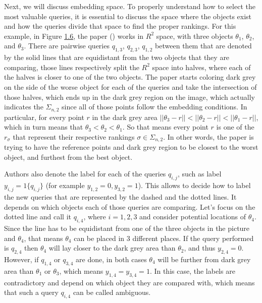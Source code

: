 \documentclass[
  letterpaper,
  DIV=11,
  numbers=noendperiod,
  oneside]{scrreprt}
\theoremstyle{remark}
\begin{document}
Next, we will discuss embedding space. To properly understand how to
select the most valuable queries, it is essential to discuss the space
where the objects exist and how the queries divide that space to find
the proper rankings. For this example, in Figure
\hyperref[fig:dim-space]{1.6}, the paper () works in \(R^2\) space, with three objects
\(\theta_1\), \(\theta_2\), and \(\theta_3\). There are pairwise queries
\(q_{1,3}\), \(q_{2,3}\), \(q_{1,2}\) between them that are denoted by
the solid lines that are equidistant from the two objects that they are
comparing, those lines respectively split the \(R^2\) space into halves,
where each of the halves is closer to one of the two objects. The paper
starts coloring dark grey on the side of the worse object for each of
the queries and take the intersection of those halves, which ends up in
the dark grey region on the image, which actually indicates the
\(\Sigma_{n,2}\) since all of those points follow the embedding
conditions. In particular, for every point \(r\) in the dark grey area
\(||\theta_3 - r|| < ||\theta_2 - r|| < ||\theta_1 -  r||\), which in
turn means that \(\theta_3 < \theta_2 < \theta_1\). So that means every
point \(r\) is one of the \(r_\sigma\) that represent their respective
rankings \(\sigma \in \Sigma_{n,2}\). In other words, the paper is
trying to have the reference points and dark grey region to be closest
to the worst object, and furthest from the best object.

Authors also denote the label for each of the queries \(q_{i,j}\), such
as label \(y_{i,j} = 1\{q_{i,j}\}\) (for example
\(y_{1,2} = 0, y_{3,2} = 1\)). This allows to decide how to label the
new queries that are represented by the dashed and the dotted lines. It
depends on which objects each of those queries are comparing. Let's
focus on the dotted line and call it \(q_{i,4}\), where \(i={1,2,3}\)
and consider potential locations of \(\theta_4\). Since the line has to
be equidistant from one of the three objects in the picture and
\(\theta_4\), that means \(\theta_4\) can be placed in 3 different
places. If the query performed is \(q_{2,4}\) then \(\theta_4\) will lay
closer to the dark grey area than \(\theta_2\), and thus
\(y_{2,4} = 0\). However, if \(q_{1,4}\) or \(q_{3,4}\) are done, in
both cases \(\theta_4\) will be further from dark grey area than
\(\theta_1\) or \(\theta_3\), which means \(y_{1,4} = y_{3,4} = 1\). In
this case, the labels are contradictory and depend on which object they
are compared with, which means that such a query \(q_{i,4}\) can be
called ambiguous.
\end{document}
